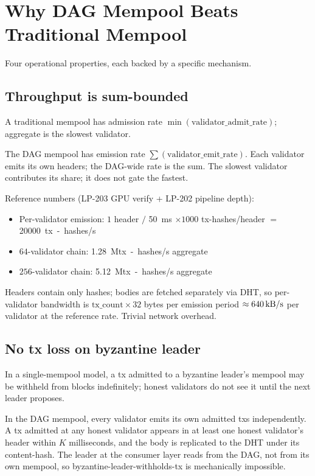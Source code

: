 \section{Why DAG Mempool Beats Traditional Mempool}

Four operational properties, each backed by a specific mechanism.

\subsection{Throughput is sum-bounded}

A traditional mempool has admission rate
$\min(\textrm{validator\_admit\_rate})$; aggregate is the slowest
validator.

The DAG mempool has emission rate
$\sum(\textrm{validator\_emit\_rate})$. Each validator emits its own
headers; the DAG-wide rate is the sum. The slowest validator
contributes its share; it does not gate the fastest.

Reference numbers (LP-203 GPU verify + LP-202 pipeline depth):

\begin{itemize}[leftmargin=2em,nosep]
\item Per-validator emission: $1$ header $/$
  \SI{50}{\milli\second} $\times 1000$ tx-hashes/header
  $=$ \SI{20000}{tx-hashes/s}
\item $64$-validator chain: \SI{1.28}{\mega tx-hashes/s} aggregate
\item $256$-validator chain: \SI{5.12}{\mega tx-hashes/s} aggregate
\end{itemize}

Headers contain only hashes; bodies are fetched separately via DHT,
so per-validator bandwidth is $\textrm{tx\_count} \times 32$ bytes
per emission period $\approx \SI{640}{\kilo\byte/\second}$ per
validator at the reference rate. Trivial network overhead.

\subsection{No tx loss on byzantine leader}

In a single-mempool model, a tx admitted to a byzantine leader's
mempool may be withheld from blocks indefinitely; honest validators
do not see it until the next leader proposes.

In the DAG mempool, every validator emits its own admitted txs
independently. A tx admitted at any honest validator appears in at
least one honest validator's header within $K$ milliseconds, and the
body is replicated to the DHT under its content-hash. The leader at
the consumer layer reads from the DAG, not from its own mempool, so
byzantine-leader-withholds-tx is mechanically impossible.

